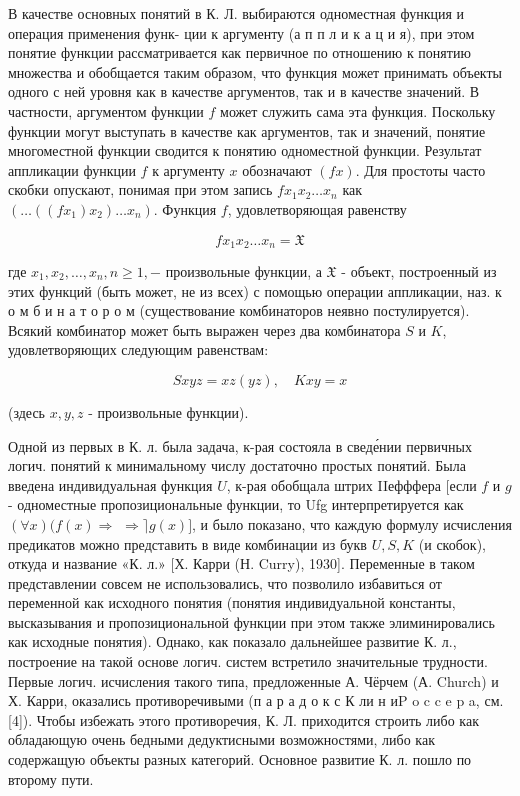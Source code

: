 \documentclass[10pt]{article}
\begin{document}
В качестве основных понятий в К. Л. выбираются одноместная функция и операция применения функ- ции к аргументу (а п п л и к а ц и я), при этом понятие функции рассматривается как первичное по отношению к понятию множества и обобщается таким образом, что функция может принимать объекты одного с ней уровня как в качестве аргументов, так и в качестве значений. В частности, аргументом функции $f$ может служить сама эта функция. Поскольку функции могут выступать в качестве как аргументов, так и значений, понятие многоместной функции сводится к понятию одноместной функции. Результат аппликации функции $f$ к аргументу $x$ обозначают $(f x)$. Для простоты часто скобки опускают, понимая при этом запись $f x_{1} x_{2} \ldots x_{n}$ как $\left(\ldots\left(\left(f x_{1}\right) x_{2}\right) \ldots x_{n}\right)$. Функция $f$, удовлетворяющая равенству



\[

f x_{1} x_{2} \ldots x_{n}=\mathfrak{X}

\]



где $x_{1}, x_{2}, \ldots, x_{n}, n \geqslant 1,-$ произвольные функции, а $\mathfrak{X}$ - объект, построенный из этих функций (быть может, не из всех) с помощью операции аппликации, наз. к о м б и н а т о р о м (существование комбинаторов неявно постулируется). Всякий комбинатор может быть выражен через два комбинатора $S$ и $K$, удовлетворяющих следующим равенствам:



\[

S x y z=x z(y z), \quad K x y=x

\]



(здесь $x, y, z$ - произвольные функции).



Одной из первых в К. л. была задача, к-рая состояла в сведе́нии первичных логич. понятий к минимальному числу достаточно простых понятий. Была введена индивидуальная функция $U$, к-рая обобщала штрих IIефффера [если $f$ и $g$ - одноместные пропозициональные функции, то Ufg интерпретируется как $(\forall x)(f(x) \Rightarrow$ $\Rightarrow\rceil g(x)]$, и было показано, что каждую формулу исчисления предикатов можно представить в виде комбинации из букв $U, S, K$ (и скобок), откуда и название «К. л.» [Х. Карри (Н. Curry), 1930]. Переменные в таком представлении совсем не использовались, что позволило избавиться от переменной как исходного понятия (понятия индивидуальной константы, высказывания и пропозициональной функции при этом также элиминировались как исходные понятия). Однако, как показало дальнейшее развитие К. л., построение на такой основе логич. систем встретило значительные трудности. Первые логич. исчисления такого типа, предложенные А. Чёрчем (А. Church) и Х. Карри, оказались противоречивыми (п а р а д о к с К ли н иP o c c e p a, см. [4]). Чтобы избежать этого противоречия, К. Л. приходится строить либо как обладающую очень бедными дедуктисными возможностями, либо как содержащую объекты разных категорий. Основное развитие К. л. пошло по второму пути.
\end{document}
